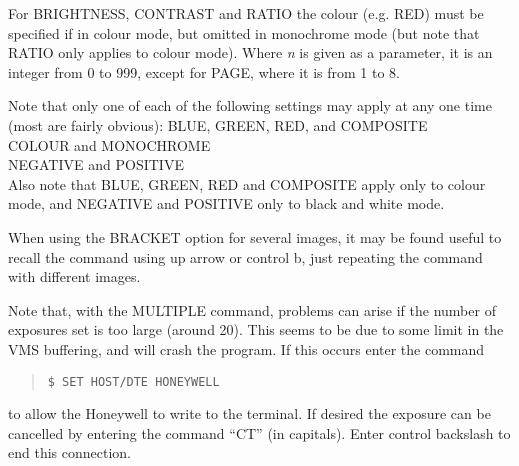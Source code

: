 For BRIGHTNESS, CONTRAST and RATIO the colour (e.g. RED) must be
specified if in colour mode, but omitted in monochrome mode (but note
that RATIO only applies to colour mode). Where {\em n} is given as a
parameter, it is an integer from 0 to 999, except for PAGE, where it is
from 1 to 8.

Note that only one of each of the following settings may apply at
any one time (most are fairly obvious):
BLUE, GREEN, RED, and COMPOSITE\\
COLOUR and MONOCHROME\\
NEGATIVE and POSITIVE\\
Also note that BLUE, GREEN, RED and COMPOSITE apply only to colour
mode, and NEGATIVE and POSITIVE only to black and white mode.

When using the BRACKET option for several images, it may be found
useful to recall the command using up arrow or control b, just
repeating the command with different images.

Note that, with the MULTIPLE command, problems can arise if the number
of exposures set is too large (around 20). This seems to be due to some
limit in the VMS buffering, and will crash the program. If this occurs
enter the command
\begin{quote}
\begin{verbatim}
$ SET HOST/DTE HONEYWELL
\end{verbatim}
\end{quote}
to allow the Honeywell to write to the terminal. If desired the exposure
can be cancelled by entering the command ``CT'' (in capitals). Enter
control backslash to end this connection.


